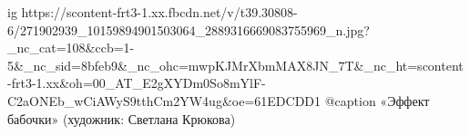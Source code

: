  
 
 
 
 




\ifcmt
  ig https://scontent-frt3-1.xx.fbcdn.net/v/t39.30808-6/271902939_10159894901503064_2889316669083755969_n.jpg?_nc_cat=108&ccb=1-5&_nc_sid=8bfeb9&_nc_ohc=mwpKJMrXbmMAX8JN_7T&_nc_ht=scontent-frt3-1.xx&oh=00_AT_E2gXYDm0So8mYlF-C2aONEb_wCiAWyS9tthCm2YW4ug&oe=61EDCDD1
	@caption «Эффект бабочки» (художник: Светлана Крюкова)
\fi
